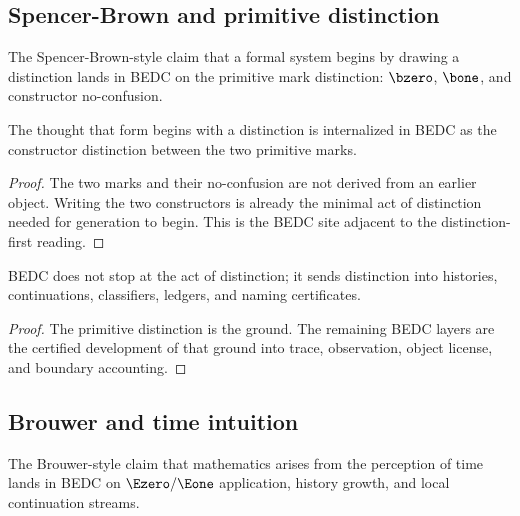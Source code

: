 \subsection{Spencer-Brown and primitive distinction}
\label{subsec:philosophy-spencer-brown-distinction}

\begin{definition}
\label{def:philosophy-distinction-genealogy}
The Spencer-Brown-style claim that a formal system begins by drawing a
distinction lands in BEDC on the primitive mark distinction:
\(\bzero\), \(\bone\), and constructor no-confusion.
\end{definition}

\begin{theorem}
\label{thm:philosophy-bedc-internalizes-distinction-site}
The thought that form begins with a distinction is internalized in
BEDC as the constructor distinction between the two primitive marks.
\end{theorem}
\begin{proof}
The two marks and their no-confusion are not derived from an earlier
object. Writing the two constructors is already the minimal act of
distinction needed for generation to begin. This is the BEDC site
adjacent to the distinction-first reading.
\end{proof}

\begin{corollary}
\label{cor:philosophy-distinction-certified-generation}
BEDC does not stop at the act of distinction; it sends distinction into
histories, continuations, classifiers, ledgers, and naming
certificates.
\end{corollary}
\begin{proof}
The primitive distinction is the ground. The remaining BEDC layers are
the certified development of that ground into trace, observation,
object license, and boundary accounting.
\end{proof}

\subsection{Brouwer and time intuition}
\label{subsec:philosophy-brouwer-time}

\begin{definition}
\label{def:philosophy-brouwer-time-site}
The Brouwer-style claim that mathematics arises from the perception of
time lands in BEDC on \(\Ezero/\Eone\) application, history growth, and
local continuation streams.
\end{definition}

